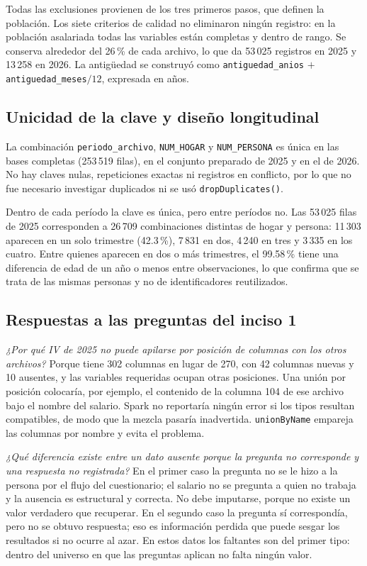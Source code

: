 \documentclass[11pt,a4paper]{article}
\newcommand{\var}[1]{\texttt{#1}}
\begin{document}
Todas las exclusiones provienen de los tres primeros pasos, que definen la población. Los siete criterios de calidad no eliminaron ningún registro: en la población asalariada todas las variables están completas y dentro de rango. Se conserva alrededor del 26\,\% de cada archivo, lo que da 53\,025 registros en 2025 y 13\,258 en 2026. La antigüedad se construyó como \var{antiguedad\_anios} $+$ \var{antiguedad\_meses}$/12$, expresada en años.

\subsection{Unicidad de la clave y diseño longitudinal}

La combinación \var{periodo\_archivo}, \var{NUM\_HOGAR} y \var{NUM\_PERSONA} es única en las bases completas (253\,519 filas), en el conjunto preparado de 2025 y en el de 2026. No hay claves nulas, repeticiones exactas ni registros en conflicto, por lo que no fue necesario investigar duplicados ni se usó \var{dropDuplicates()}.

Dentro de cada período la clave es única, pero entre períodos no. Las 53\,025 filas de 2025 corresponden a 26\,709 combinaciones distintas de hogar y persona: 11\,303 aparecen en un solo trimestre (42.3\,\%), 7\,831 en dos, 4\,240 en tres y 3\,335 en los cuatro. Entre quienes aparecen en dos o más trimestres, el 99.58\,\% tiene una diferencia de edad de un año o menos entre observaciones, lo que confirma que se trata de las mismas personas y no de identificadores reutilizados.

\subsection{Respuestas a las preguntas del inciso 1}

\textit{¿Por qué IV de 2025 no puede apilarse por posición de columnas con los otros archivos?} Porque tiene 302 columnas en lugar de 270, con 42 columnas nuevas y 10 ausentes, y las variables requeridas ocupan otras posiciones. Una unión por posición colocaría, por ejemplo, el contenido de la columna 104 de ese archivo bajo el nombre del salario. Spark no reportaría ningún error si los tipos resultan compatibles, de modo que la mezcla pasaría inadvertida. \var{unionByName} empareja las columnas por nombre y evita el problema.

\textit{¿Qué diferencia existe entre un dato ausente porque la pregunta no corresponde y una respuesta no registrada?} En el primer caso la pregunta no se le hizo a la persona por el flujo del cuestionario; el salario no se pregunta a quien no trabaja y la ausencia es estructural y correcta. No debe imputarse, porque no existe un valor verdadero que recuperar. En el segundo caso la pregunta sí correspondía, pero no se obtuvo respuesta; eso es información perdida que puede sesgar los resultados si no ocurre al azar. En estos datos los faltantes son del primer tipo: dentro del universo en que las preguntas aplican no falta ningún valor.
\end{document}

